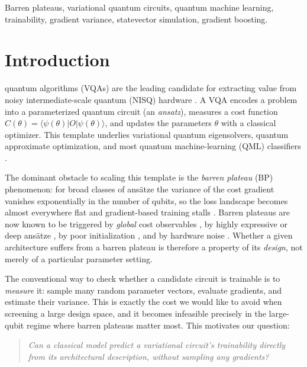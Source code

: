 \documentclass[journal]{IEEEtran}
\begin{document}
\begin{IEEEkeywords}
Barren plateaus, variational quantum circuits, quantum machine learning,
trainability, gradient variance, statevector simulation, gradient boosting.
\end{IEEEkeywords}

\section{Introduction}
 quantum algorithms (VQAs) are the leading candidate
for extracting value from noisy intermediate-scale quantum (NISQ) hardware
\cite{cerezo2021vqa}. A VQA encodes a problem into a parameterized quantum
circuit (an \emph{ansatz}), measures a cost function $C(\theta)=\langle\psi(\theta)|O|\psi(\theta)\rangle$,
and updates the parameters $\theta$ with a classical optimizer. This template
underlies variational quantum eigensolvers, quantum approximate optimization, and
most quantum machine-learning (QML) classifiers \cite{havlicek2019supervised,
farhi2018classification,schuld2020circuit}.

The dominant obstacle to scaling this template is the \emph{barren plateau} (BP)
phenomenon: for broad classes of ans{\"a}tze the variance of the cost gradient
vanishes exponentially in the number of qubits, so the loss landscape becomes
almost everywhere flat and gradient-based training stalls
\cite{mcclean2018barren,larocca2025barren}. Barren plateaus are now known to be
triggered by \emph{global} cost observables \cite{cerezo2021cost}, by highly
expressive or deep ans{\"a}tze \cite{holmes2022expressibility}, by poor
initialization \cite{grant2019initialization}, and by hardware noise
\cite{wang2021noise}. Whether a given architecture suffers from a barren plateau
is therefore a property of its \emph{design}, not merely of a particular
parameter setting.

The conventional way to check whether a candidate circuit is trainable is to
\emph{measure} it: sample many random parameter vectors, evaluate gradients, and
estimate their variance. This is exactly the cost we would like to avoid when
screening a large design space, and it becomes infeasible precisely in the
large-qubit regime where barren plateaus matter most. This motivates our
question:

\begin{quote}
\emph{Can a classical model predict a variational circuit's trainability
directly from its architectural description, without sampling any gradients?}
\end{quote}
\end{document}
